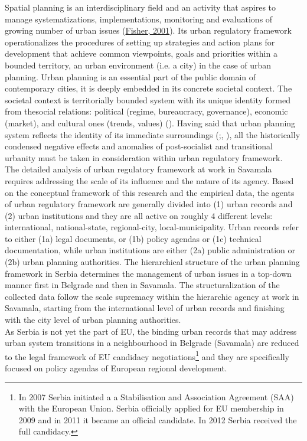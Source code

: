 \documentclass[11pt]{report}
\begin{document}
Spatial planning is an interdisciplinary field and an activity that aspires to manage systematizations, implementations, monitoring and evaluations of growing number of urban issues (\href{}{Fisher, 2001}). Its urban regulatory framework operationalizes the procedures of setting up strategies and action plans for development that achieve common viewpoints, goals and priorities within a bounded territory, an urban environment (i.e. a city) in the case of urban planning.
Urban planning is an essential part of the public domain of contemporary cities, it is deeply embedded in its concrete societal context.
The societal context is territorially bounded system with its unique identity formed from thesocial relations:
political (regime, bureaucracy, governance),
economic (market), and
cultural ones (trends, values) (\href{}{\citealt{vujosevic_planning_2006}}).
Having said that urban planning system reflects the identity of its immediate surroundings (\cite{Stojkov and Dobricic 2012};, \cite{Arbter 2001}), all the historically condensed negative effects and anomalies of post-socialist and transitional urbanity must be taken in consideration within urban regulatory framework.
\\
The detailed analysis of urban regulatory framework at work in Savamala requires addressing the scale of its influence and the nature of its agency.
Based on the conceptual framework of this research and the empirical data, the agents of urban regulatory framework are generally divided into  (1) urban records and (2) urban institutions and they are all active on roughly 4 different levels: international, national-state, regional-city, local-municipality.
Urban records refer to either (1a) legal documents, or (1b) policy agendas or (1c) technical documentation, while urban institutions are either (2a) public administration or (2b) urban planning authorities.
The hierarchical structure of the urban planning framework in Serbia determines the management of urban issues in a top-down manner first in Belgrade and then in Savamala.
The structuralization of the collected data follow the scale supremacy within the hierarchic agency at work in Savamala, starting from the international level of urban records and finishing with the city level of urban planning authorities.
\\
As Serbia is not yet the part of EU, the binding urban records that may address urban system transitions in a neighbourhood in Belgrade (Savamala) are reduced to the legal framework of EU candidacy negotiations\footnote{In 2007 Serbia initiated a a Stabilisation and Association Agreement (SAA) with the European Union. Serbia officially applied for EU membership in 2009 and in 2011 it became an official candidate. In 2012 Serbia received the full candidacy.}
and they are specifically focused on policy agendas of European regional development.
\end{document}
